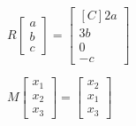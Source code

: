 \begin{exercise}
\begin{inparaenum}[a)]
\item $R\begin{bmatrix}a \\ b \\ c \end{bmatrix} =\begin{bmatrix*}[C] 2a \\ 3b \\ 0 \\ -c \end{bmatrix*}$ \hfill
\item $M \begin{bmatrix}x_1\\ x_2 \\ x_3\end{bmatrix}=\begin{bmatrix}x_2\\ x_1 \\ x_3\end{bmatrix}$ \hfill {} \\
\end{inparaenum}
\end{exercise}
